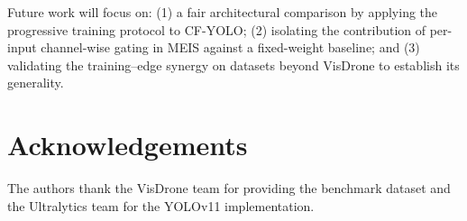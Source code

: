 \documentclass[preprint,12pt]{elsarticle}
\begin{document}
Future work will focus on: (1) a fair architectural comparison by applying the
progressive training protocol to CF-YOLO; (2) isolating the contribution of
per-input channel-wise gating in MEIS against a fixed-weight baseline; and
(3) validating the training--edge synergy on datasets beyond VisDrone to establish
its generality.



\section*{Acknowledgements}

The authors thank the VisDrone team for providing the benchmark dataset and the
Ultralytics team for the YOLOv11 implementation.





\end{document}
